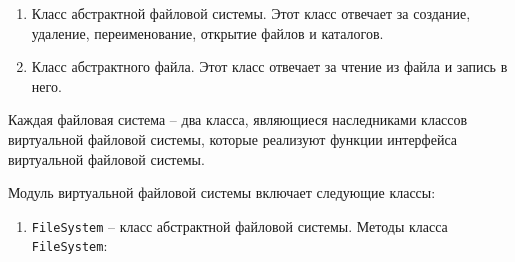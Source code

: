 \begin{enumerate}
	\item Класс абстрактной файловой системы. Этот класс отвечает за создание, удаление, переименование, открытие файлов и каталогов.
	\item Класс абстрактного файла. Этот класс отвечает за чтение из файла и запись в него.
\end{enumerate}

Каждая файловая система -- два класса, являющиеся наследниками классов виртуальной файловой системы, которые реализуют функции интерфейса виртуальной файловой системы.

Модуль виртуальной файловой системы включает следующие классы:

\begin{enumerate}
	\item \texttt{FileSystem} -- класс абстрактной файловой системы. Методы класса \texttt{FileSystem}:
	

\end{enumerate}
